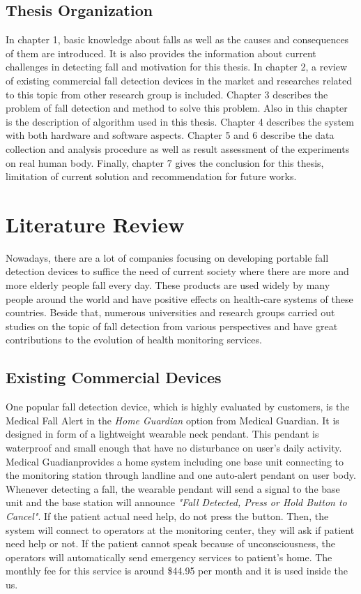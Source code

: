 \documentclass[letterpaper,12pt,titlepage,oneside,final]{book}
\begin{document}
\section{Thesis Organization}
In chapter 1, basic knowledge about falls as well as the causes and consequences of them are introduced. It is also provides the information about current challenges in detecting fall and motivation for this thesis. In chapter 2, a review of existing commercial fall detection devices in the market and researches related to this topic from  other research group is included. Chapter 3 describes the problem of fall detection and method to solve this problem. Also in this chapter is the description of algorithm used in this thesis. Chapter 4 describes the system with both hardware and software aspects. Chapter 5 and 6 describe the data collection and analysis procedure as well as result assessment of the experiments on real human body. Finally, chapter 7 gives the conclusion for this thesis, limitation of current solution and recommendation for future works.
\chapter{Literature Review}
Nowadays, there are a lot of companies focusing on developing portable fall detection devices to suffice the need of current society where there are more and more elderly people fall every day. These products are used widely by many people around the world and have positive effects on health-care systems of these countries. Beside that, numerous universities and research groups carried out studies on the topic of fall detection from various perspectives and have great contributions to the evolution of health monitoring services.  
\section{Existing Commercial Devices}
One popular fall detection device, which is highly evaluated by customers, is the Medical Fall Alert in the \textit{Home Guardian} option from Medical Guardian\textregistered. It is designed in form of a lightweight wearable neck pendant. This pendant is waterproof and small enough that have no disturbance on user's daily activity. Medical Guadian\textregistered provides a home system including one base unit connecting to the monitoring station through landline and one auto-alert pendant on user body. Whenever detecting a fall, the wearable pendant will send a signal to the base unit and the base station will announce \textit{"Fall Detected, Press or Hold Button to Cancel"}. If the patient actual need help, do not press the button. Then, the system will connect to operators at the monitoring center, they will ask if patient need help or not. If the patient cannot speak because of unconsciousness, the operators will automatically send emergency services to patient's home. The monthly fee for this service is around \$44.95 per month and it is used inside the \gls{us}.
\end{document}
